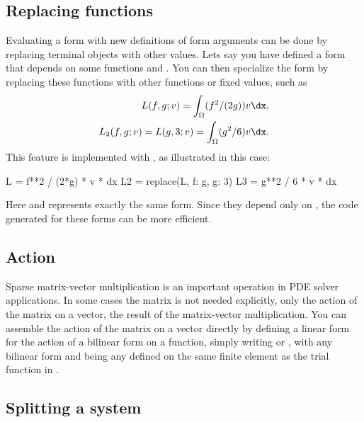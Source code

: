 \subsection{Replacing functions}
\label{ufl:sec:replace}

Evaluating a form with new definitions of form arguments can be done
by replacing terminal objects with other values.  Lets say you have
defined a form  that depends on some functions  and
.  You can then specialize the form by replacing these
functions with other functions or fixed values, such as
\begin{align}
L(f, g; v) = \int_\Omega (f^2 / (2g)) v \dx, \\
L_2(f, g; v) = L(g, 3; v) = \int_\Omega (g^2 / 6) v \dx.
\end{align}
This feature is implemented with , as illustrated in this case:
\begin{code}
L = f**2 / (2*g) * v * dx
L2 = replace(L, { f: g, g: 3})
L3 = g**2 / 6 * v * dx
\end{code}
Here  and  represents exactly the same form. Since
they depend only on , the code generated for these forms can
be more efficient.

\subsection{Action}
\label{ufl:sec:action}

Sparse matrix-vector multiplication is an important operation in PDE
solver applications. In some cases the matrix is not needed
explicitly, only the action of the matrix on a vector, the result of
the matrix-vector multiplication.  You can assemble the action of the
matrix on a vector directly by defining a linear form for the action
of a bilinear form on a function, simply writing  or , with  any bilinear form and 
being any
 defined on the same finite
element as the trial function in .

\subsection{Splitting a system}
\label{ufl:sec:system}

